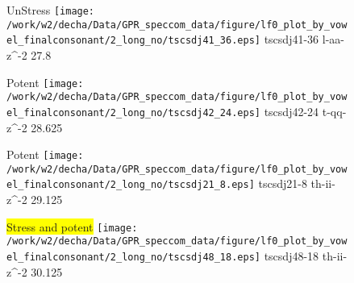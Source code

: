 \documentclass{article}
\begin{document}
\begin{figure}[t]
\begin{minipage}[b]{.24\textwidth}
UnStress
\centering
\texttt{[image: /work/w2/decha/Data/GPR\_speccom\_data/figure/lf0\_plot\_by\_vowel\_finalconsonant/2\_long\_no/tscsdj41\_36.eps]}
tscsdj41-36 l-aa-z\textasciicircum-2 27.8
\end{minipage}
\begin{minipage}[b]{.24\textwidth}
\colorbox{Apricot}{Potent}
\centering
\texttt{[image: /work/w2/decha/Data/GPR\_speccom\_data/figure/lf0\_plot\_by\_vowel\_finalconsonant/2\_long\_no/tscsdj42\_24.eps]}
tscsdj42-24 t-qq-z\textasciicircum-2 28.625
\end{minipage}
\begin{minipage}[b]{.24\textwidth}
\colorbox{Apricot}{Potent}
\centering
\texttt{[image: /work/w2/decha/Data/GPR\_speccom\_data/figure/lf0\_plot\_by\_vowel\_finalconsonant/2\_long\_no/tscsdj21\_8.eps]}
tscsdj21-8 th-ii-z\textasciicircum-2 29.125
\end{minipage}
\begin{minipage}[b]{.24\textwidth}
\colorbox{yellow}{Stress and potent}
\centering
\texttt{[image: /work/w2/decha/Data/GPR\_speccom\_data/figure/lf0\_plot\_by\_vowel\_finalconsonant/2\_long\_no/tscsdj48\_18.eps]}
tscsdj48-18 th-ii-z\textasciicircum-2 30.125
\end{minipage}
\end{figure}
\end{document}
